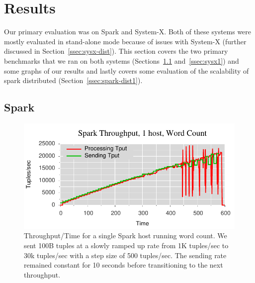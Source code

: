 \section{Results}

Our primary evaluation was on Spark and System-X. Both of these systems were
mostly evaluated in stand-alone mode because of issues with System-X (further
discussed in Section~\ref{ssec:sysx-dist}). This section covers the two primary
benchmarks that we ran on both systems (Sections~\ref{ssec:spark1}
and~\ref{ssec:sysx1}) and some graphs of our results and lastly covers some
evaluation of the scalability of spark distributed
(Section~\ref{ssec:spark-dist1}).

\subsection{Spark}
\label{ssec:spark1}

\begin{figure}[b]
\centering
\includegraphics[width=1\linewidth]{figures/sp1_tput.pdf}
\caption{Throughput/Time for a single Spark host running word count. We sent 100B tuples at a
slowly ramped up rate from 1K tuples/sec to 30k tuples/sec with a step size of
500 tuples/sec. The sending rate remained constant for 10 seconds before
transitioning to the next throughput.}
\label{fig:sp1-tput}
\end{figure}

